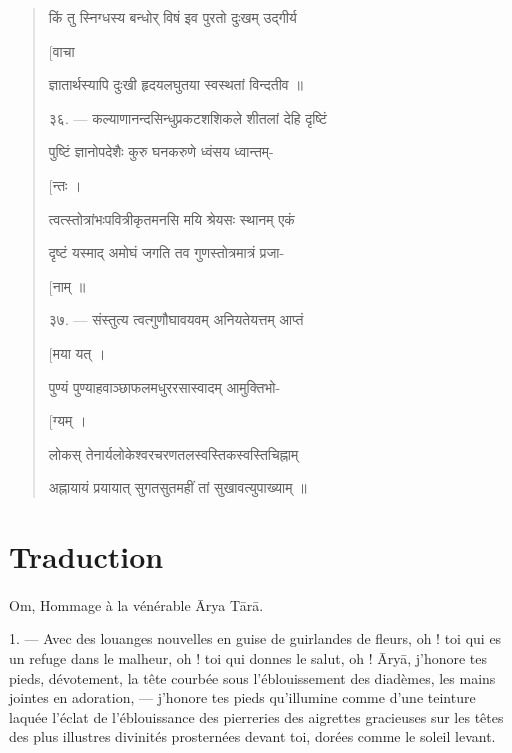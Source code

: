 \documentclass[a4paper, 11pt, oneside, french]{article}
\begin{document}
\begin{quotation}
\texthindi{किं तु स्निग्धस्य बन्धोर् विषं इव पुरतो दुःखम् उद्गीर्य}

\hspace*{65mm}\texthindi{[वाचा}

\texthindi{ज्ञातार्थस्यापि दुःखी हृदयलघुतया स्वस्थतां विन्दतीव ॥}

\bigskip

\texthindi{३६}. --- \texthindi{कल्याणानन्दसिन्धुप्रकटशशिकले शीतलां देहि दृष्टिं}

\texthindi{पुष्टिं ज्ञानोपदेशैः कुरु घनकरुणे ध्वंसय ध्वान्तम्-}

\hspace*{65mm}\texthindi{[न्तः ।}

\texthindi{त्वत्स्तोत्रांभःपवित्रीकृतमनसि मयि श्रेयसः स्थानम् एकं}

\texthindi{दृष्टं यस्माद् अमोघं जगति तव गुणस्तोत्रमात्रं प्रजा-}

\hspace*{65mm}\texthindi{[नाम् ॥}

\bigskip

\texthindi{३७}. --- \texthindi{संस्तुत्य त्वत्गुणौघावयवम् अनियतेयत्तम् आप्तं}

\hspace*{65mm}\texthindi{[मया यत् ।}

\texthindi{पुण्यं पुण्याहवाञ्छाफलमधुररसास्वादम् आमुक्तिभो-}

\hspace*{65mm}\texthindi{[ग्यम् ।}

\texthindi{लोकस् तेनार्यलोकेश्वरचरणतलस्वस्तिकस्वस्तिचिह्नाम्}

\texthindi{अह्नायायं प्रयायात् सुगतसुतमहीं तां सुखावत्युपाख्याम् ॥}
\end{quotation}
\clearpage
\section{Traduction}
\paragraph{}
Om, Hommage à la vénérable \={A}rya T\={a}r\={a}.

\bigskip

1. --- Avec des louanges nouvelles en guise de guirlandes de fleurs, oh ! toi qui es un refuge dans le malheur, oh ! toi qui donnes le salut, oh ! \={A}ry\={a}, j'honore tes pieds, dévotement, la tête courbée sous l'éblouissement des diadèmes, les mains jointes en adoration, --- j'honore tes pieds qu'illumine comme d'une teinture laquée l'éclat de l'éblouissance des pierreries des aigrettes gracieuses sur les têtes des plus illustres divinités prosternées devant toi, dorées comme le soleil levant.
\end{document}
